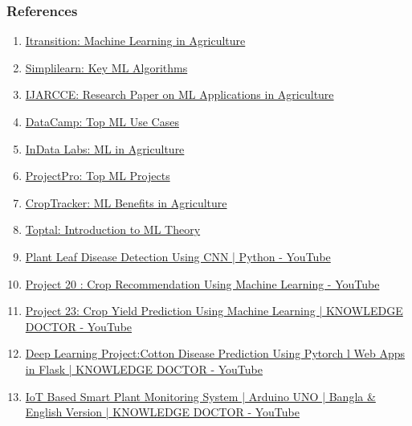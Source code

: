 \begin{frame}[fragile]\frametitle{References}
    \begin{enumerate}
        \item \href{https://www.itransition.com/machine-learning/agriculture}{Itransition: Machine Learning in Agriculture}
        \item \href{https://www.simplilearn.com/10-algorithms-machine-learning-engineers-need-to-know-article}{Simplilearn: Key ML Algorithms}
        \item \href{https://www.ijarcce.com/upload/2016/april-16/IJARCCE%2087.pdf}{IJARCCE: Research Paper on ML Applications in Agriculture}
        \item \href{https://www.datacamp.com/blog/top-machine-learning-use-cases-and-algorithms}{DataCamp: Top ML Use Cases}
        \item \href{https://indatalabs.com/blog/ml-in-agriculture}{InData Labs: ML in Agriculture}
        \item \href{https://www.projectpro.io/article/top-10-machine-learning-projects-for-beginners-in-2021/397}{ProjectPro: Top ML Projects}
        \item \href{https://www.croptracker.com/blog/what-is-machine-learning-how-will-it-benefit-agriculture.html}{CropTracker: ML Benefits in Agriculture}
        \item \href{https://www.toptal.com/machine-learning/machine-learning-theory-an-introductory-primer}{Toptal: Introduction to ML Theory}
		\item \href{https://www.youtube.com/watch?v=zcq5aw9t-Ds}{Plant Leaf Disease Detection Using CNN | Python - YouTube}		
		\item \href{https://www.youtube.com/watch?v=T7\_GR8l-N5A}{Project 20 : Crop Recommendation Using Machine Learning - YouTube}		
		\item \href{https://www.youtube.com/watch?v=LEnjAR6AwOo}{Project 23: Crop Yield Prediction Using Machine Learning | KNOWLEDGE DOCTOR - YouTube}
		\item \href{https://www.youtube.com/watch?v=Yj-lHSfovw4}{Deep Learning Project:Cotton Disease Prediction Using Pytorch l Web Apps in Flask | KNOWLEDGE DOCTOR - YouTube}
		\item \href{https://www.youtube.com/watch?v=59H5\_1Q4lqU}{IoT Based Smart Plant Monitoring System | Arduino UNO | Bangla & English Version | KNOWLEDGE DOCTOR - YouTube}
    \end{enumerate}
\end{frame}
